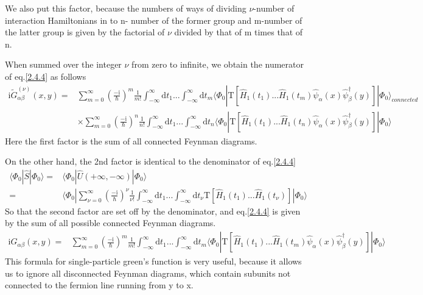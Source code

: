 We also put this factor, because the numbers of ways of dividing $\nu$-number of interaction Hamiltonians in to n- number of the former group and m-number of the latter group is given by the factorial of $\nu$ divided by that of m times that of n.

When summed over the integer $\nu$ from zero to infinite, we obtain the numerator of eq.\eqref{2.4.4} as follows
\begin{align}
\mathrm{i}\tilde{G}_{\alpha\beta}^{(\nu)}(x,y)=& \sum_{m=0}^{\infty}(\frac{-\mathrm{i}}{\hbar})^{m}\frac{1}{m!}\int_{-\infty}^{\infty}\mathrm{d}t_1...\int_{-\infty}^{\infty}\mathrm{d}t_{m}\langle\Phi_0|\mathrm{T}[\hat H_1(t_1)...\hat H_1(t_{m})\hat \psi_{\alpha}(x)\hat \psi^{\dagger}_{\beta}(y)]|\Phi_0\rangle_{connected} \nonumber \\
&\times\sum_{m=0}^{\infty}(\frac{-\mathrm{i}}{\hbar})^{n}\frac{1}{n!}\int_{-\infty}^{\infty}\mathrm{d}t_1...\int_{-\infty}^{\infty}\mathrm{d}t_{n}\langle\Phi_0|\mathrm{T}[\hat H_1(t_1)...\hat H_1(t_{n})\hat \psi_{\alpha}(x)\hat \psi^{\dagger}_{\beta}(y)]|\Phi_0\rangle\nonumber 
\end{align}
Here the first factor is the sum of all connected Feynman diagrams.

On the other hand, the 2nd factor is identical to the denominator of eq.\eqref{2.4.4}
\begin{align}
\langle\Phi_0|\hat{S}|\Phi_0\rangle=&\langle\Phi_0|\hat{U}(+\infty,-\infty)|\Phi_0\rangle \nonumber \\
=&\langle\Phi_0|\sum_{\nu=0}^{\infty}(\frac{-\mathrm{i}}{\hbar})^{\nu}\frac{1}{\nu!}\int_{-\infty}^{\infty}\mathrm{d}t_1...\int_{-\infty}^{\infty}\mathrm{d}t_{\nu}\mathrm{T}[\hat H_1(t_1)...\hat H_1(t_{\nu})]|\Phi_0\rangle\nonumber 
\end{align}
So that the second factor are set off by the denominator, and eq.\eqref{2.4.4} is given by the sum of all possible connected Feynman diagrams.
\begin{align} \label{2.5.3}
\mathrm{i}G_{\alpha\beta}(x,y)=& \sum_{m=0}^{\infty}(\frac{-\mathrm{i}}{\hbar})^{m}\frac{1}{m!}\int_{-\infty}^{\infty}\mathrm{d}t_1...\int_{-\infty}^{\infty}\mathrm{d}t_{m}\langle\Phi_0|\mathrm{T}[\hat H_1(t_1)...\hat H_1(t_{m})\hat \psi_{\alpha}(x)\hat \psi^{\dagger}_{\beta}(y)]|\Phi_0\rangle
\end{align}
This formula for single-particle green's function is very useful, because it allows us to ignore all disconnected Feynman diagrams, which contain subunits not connected to the fermion line running from y to x.

